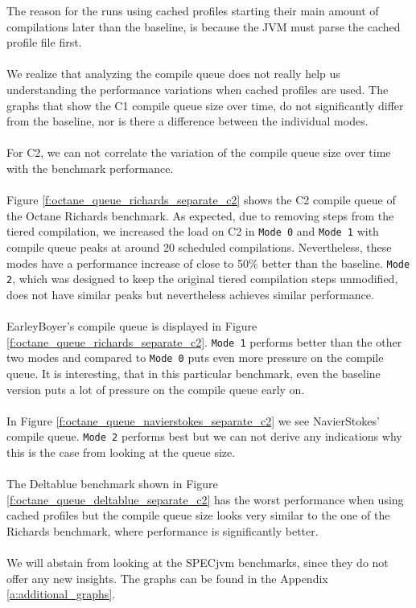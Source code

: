 The reason for the runs using cached profiles starting their main amount of compilations later than the baseline, is because the JVM must parse the cached profile file first.
\\\\
We realize that analyzing the compile queue does not really help us understanding the performance variations when cached profiles are used.
The graphs that show the C1 compile queue size over time, do not significantly differ from the baseline, nor is there a difference between the individual modes.
\\\\
For C2, we can not correlate the variation of the compile queue size over time with the benchmark performance.
\\\\
Figure \ref{f:octane_queue_richards_separate_c2} shows the C2 compile queue of the Octane Richards benchmark. As expected, due to removing steps from the tiered compilation, we increased the load on C2 in \texttt{Mode 0} and \texttt{Mode 1} with compile queue peaks at around 20 scheduled compilations. Nevertheless, these modes have a performance increase of close to 50\% better than the baseline. \texttt{Mode 2}, which was designed to keep the original tiered compilation steps unmodified, does not have similar peaks but nevertheless achieves similar performance.
\\\\
EarleyBoyer's compile queue is displayed in Figure \ref{f:octane_queue_richards_separate_c2}. \texttt{Mode 1} performs better than the other two modes and compared to \texttt{Mode 0} puts even more pressure on the compile queue.
It is interesting, that in this particular benchmark, even the baseline version puts a lot of pressure on the compile queue early on.
\\\\
In Figure \ref{f:octane_queue_navierstokes_separate_c2} we see NavierStokes' compile queue. \texttt{Mode 2} performs best but we can not derive any indications why this is the case from looking at the queue size.
\\\\
The Deltablue benchmark shown in Figure \ref{f:octane_queue_deltablue_separate_c2} has the worst performance when using cached profiles but the compile queue size looks very similar to the one of the Richards benchmark, where performance is significantly better.
\\\\
We will abstain from looking at the SPECjvm benchmarks, since they do not offer any new insights. The graphs can be found in the Appendix \ref{a:additional_graphs}.
